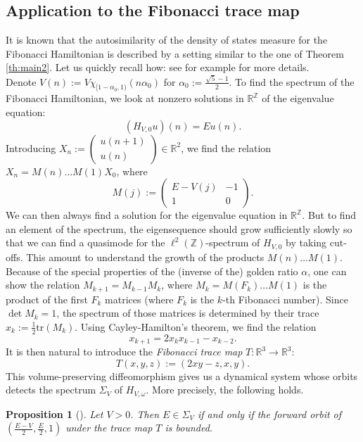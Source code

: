 \documentclass[a4paper]{article}
\newtheorem{proposition}[theorem]{Proposition}
\theoremstyle{definition}
\begin{document}
\subsection{Application to the Fibonacci trace map}

It is known that the autosimilarity of the density of states measure for the Fibonacci Hamiltonian is described by a setting similar to the one of Theorem \ref{th:main2}. Let us quickly recall how: see for example \cite{Su87,DG09,DGY16,DF22} for more details. \\ 

Denote $V(n) := V \chi_{[1-\alpha_0,1)}(n \alpha_0)$ for $\alpha_0 := \frac{\sqrt{5}-1}{2}$. To find the spectrum of the Fibonacci Hamiltonian, we look at nonzero solutions in $\mathbb{R}^\mathbb{Z}$ of the eigenvalue equation:
$$ (H_{V,0} u)(n) = E u(n). $$
Introducing $X_n := \begin{pmatrix} u(n+1) \\ u(n) \end{pmatrix}  \in \mathbb{R}^2$, we find the relation $ X_{n} =  M(n) \dots M(1) X_0  $, where $$ M(j) := \begin{pmatrix} E-V(j) & -1 \\ 1  & 0 \end{pmatrix}.  $$
We can then always find a solution for the eigenvalue equation in $\mathbb{R}^\mathbb{Z}$. But to find an element of the spectrum, the eigensequence should grow sufficiently slowly so that we can find a quasimode for the $\ell^2(\mathbb{Z})$-spectrum of $H_{V,0}$ by taking cut-offs. This amount to understand the growth of the products $M(n) \dots M(1)$. Because of the special properties of the (inverse of the) golden ratio $\alpha$, one can show the relation $M_{k+1} = M_{k-1} M_{k}$, where $M_k = M(F_k) \dots M(1)$ is the product of the first $F_k$ matrices (where $F_k$ is the $k$-th Fibonacci number). Since $\det M_k = 1$, the spectrum of those matrices is determined by their trace $x_k := \frac{1}{2} \text{tr}(M_k)$. Using Cayley-Hamilton's theorem, we find the relation
$$ x_{k+1} = 2 x_k x_{k-1} - x_{k-2}.$$
It is then natural to introduce the \emph{Fibonacci trace map} $T:\mathbb{R}^3 \longrightarrow \mathbb{R}^3$:
$$ T(x,y,z) := (2xy-z,x,y). $$
This volume-preserving diffeomorphism gives us a dynamical system whose orbits detects the spectrum $\Sigma_V$ of $H_{V,\omega}$. More precisely, the following holds.

\begin{proposition}[\cite{Su87}]\label{spectrum}
Let $V>0$. Then $E \in \Sigma_V$ if and only if the forward orbit of $(\frac{E-V}{2},\frac{E}{2},1)$ under the trace map $T$ is bounded.
\end{proposition}
\end{document}
